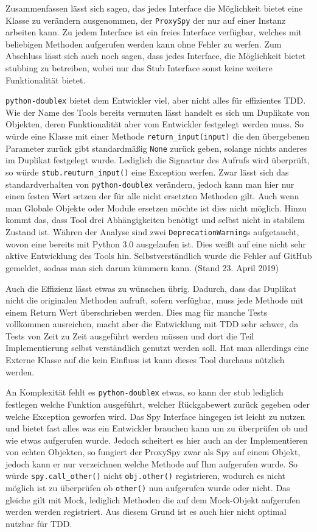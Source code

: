 Zusammenfassen lässt sich sagen, das jedes Interface die Möglichkeit bietet eine Klasse
zu verändern ausgenommen, der \lstinline{ProxySpy} der nur auf einer Instanz arbeiten kann.
Zu jedem Interface ist ein freies Interface verfügbar, welches mit beliebigen Methoden
aufgerufen werden kann ohne Fehler zu werfen. Zum Abschluss lässt sich auch noch sagen, dass
jedes Interface, die Möglichkeit bietet stubbing zu betreiben, wobei nur das Stub Interface
sonst keine weitere Funktionalität bietet.


\lstinline{python-doublex} bietet dem Entwickler viel, aber nicht alles für effizientes TDD.
Wie der Name des Tools bereits vermuten lässt handelt es sich um Duplikate von Objekten, deren
Funktionalität aber vom Entwickler festgelegt werden muss. So würde eine Klasse mit einer Methode
\lstinline{return_input(input)} die den übergebenen Parameter zurück gibt standardmäßig
\lstinline{None} zurück geben, solange nichts anderes im Duplikat festgelegt wurde. Lediglich
die Signartur des Aufrufs wird überprüft, so würde \lstinline{stub.reuturn_input()} eine Exception
werfen. Zwar lässt sich das standardverhalten von \lstinline{python-doublex} verändern, jedoch
kann man hier nur einen festen Wert setzen der für alle nicht ersetzten Methoden gilt. Auch
wenn man Globale Objekte oder Module ersetzen möchte ist dies nicht möglich. Hinzu kommt das,
dass Tool drei Abhängigkeiten benötigt und selbst nicht in stabilem Zustand ist. Währen der
Analyse sind zwei \lstinline{DeprecationWarning}s aufgetaucht, wovon eine bereits mit Python 3.0
ausgelaufen ist. Dies weißt auf eine nicht sehr aktive Entwicklung des Tools hin. Selbstverständlich
wurde die Fehler auf GitHub gemeldet, sodass man sich darum kümmern kann. (Stand 23. April 2019)

Auch die Effizienz lässt etwas zu wünschen übrig. Dadurch, dass das Duplikat nicht die originalen
Methoden aufruft, sofern verfügbar, muss jede Methode mit einem Return Wert überschrieben werden.
Dies mag für manche Tests vollkommen ausreichen, macht aber die Entwicklung mit TDD sehr schwer,
da Tests von Zeit zu Zeit ausgeführt werden müssen und dort die Teil Implementierung selbst
verständlich genutzt werden soll. Hat man allerdings eine Externe Klasse auf die kein Einfluss ist
kann dieses Tool durchaus nützlich werden.

An Komplexität fehlt es \lstinline{python-doublex} etwas, so kann der \Gls{stub} lediglich festlegen
welche Funktion ausgeführt, welcher Rückgabewert zurück gegeben oder welche Exception geworfen wird.
Das Spy Interface hingegen ist leicht zu nutzen und bietet fast alles was ein Entwickler brauchen
kann um zu überprüfen ob und wie etwas aufgerufen wurde. Jedoch scheitert es hier auch an der
Implementieren von echten Objekten, so fungiert der ProxySpy zwar als Spy auf einem Objekt, jedoch
kann er nur verzeichnen welche Methode auf Ihm aufgerufen wurde. So würde \lstinline{spy.call_other()}
nicht \lstinline{obj.other()} registrieren, wodurch es nicht möglich ist zu überprüfen ob
\lstinline{other()} nun aufgerufen wurde oder nicht. Das gleiche gilt mit Mock, lediglich Methoden
die auf dem Mock-Objekt aufgerufen werden werden registriert. Aus diesem Grund ist es auch hier nicht
optimal nutzbar für TDD.

